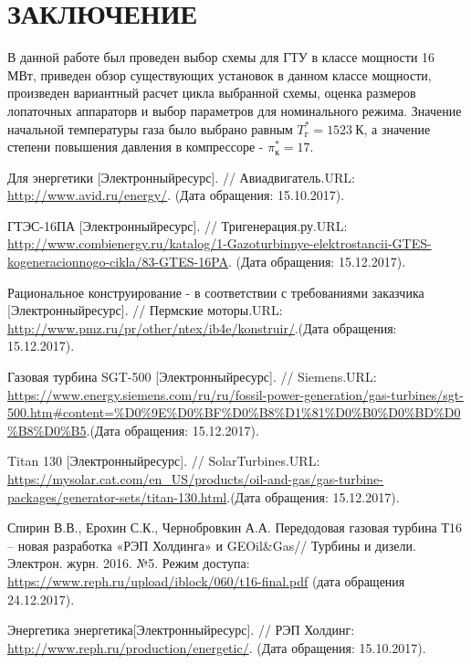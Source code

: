 \documentclass[a4paper,12pt]{article}
\begin{document}
    \newpage
    \section{ЗАКЛЮЧЕНИЕ}
    В данной работе был проведен выбор схемы для ГТУ в классе мощности 16 МВт, приведен обзор существующих установок
    в данном классе мощности, произведен вариантный расчет цикла выбранной схемы, оценка размеров лопаточных
    аппараторв и выбор параметров для номинального режима.
    Значение начальной температуры газа было выбрано равным $T_{г}^* = 1523\ К$, а значение
    степени повышения давления в компрессоре - $\pi_к^* = 17$.

    \newpage
    \begin{thebibliography}{40}

        Для энергетики [Электронныйресурс]. // Авиадвигатель.URL: \url{http://www.avid.ru/energy/}. (Дата обращения: 15.10.2017).

        ГТЭС-16ПА [Электронныйресурс]. //
        Тригенерация.ру.URL: \url{http://www.combienergy.ru/katalog/1-Gazoturbinnye-elektrostancii-GTES-kogeneracionnogo-cikla/83-GTES-16PA}.
        (Дата обращения: 15.12.2017).

        Рациональное конструирование - в соответствии с требованиями заказчика [Электронныйресурс].
        // Пермские моторы.URL: \url{http://www.pmz.ru/pr/other/ntex/ib4e/konstruir/}.(Дата обращения: 15.12.2017).

        Газовая турбина SGT-500 [Электронныйресурс]. //
        Siemens.URL: \url{https://www.energy.siemens.com/ru/ru/fossil-power-generation/gas-turbines/sgt-500.htm#content=%D0%9E%D0%BF%D0%B8%D1%81%D0%B0%D0%BD%D0%B8%D0%B5}.(Дата обращения: 15.12.2017).

        Titan 130 [Электронныйресурс]. // SolarTurbines.URL:
        \url{https://mysolar.cat.com/en_US/products/oil-and-gas/gas-turbine-packages/generator-sets/titan-130.html}.(Дата обращения: 15.12.2017).

        Спирин В.В., Ерохин С.К., Чернобровкин А.А. Передодовая газовая турбина Т16 –
        новая разработка «РЭП Холдинга» и GEOil\&Gas// Турбины и дизели.
        Электрон. журн. 2016. №5. Режим доступа:
        \url{https://www.reph.ru/upload/iblock/060/t16-final.pdf} (дата обращения 24.12.2017).

        Энергетика энергетика[Электронныйресурс]. // РЭП Холдинг:
        \url{http://www.reph.ru/production/energetic/}. (Дата обращения: 15.10.2017).


\end{thebibliography}
\end{document}

